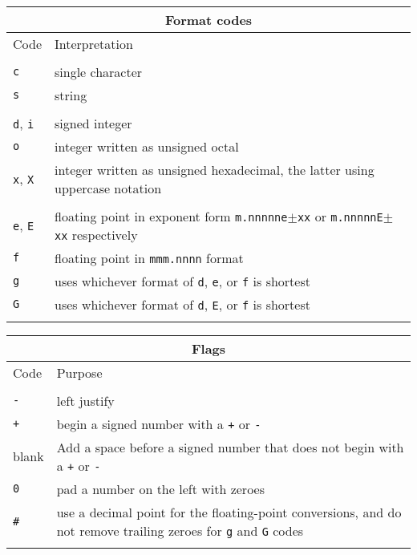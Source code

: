 \documentclass[twoside,11pt,nolof]{starlink}
\begin{document}
\ \hfill \
\begin{minipage}{75mm}
\vspace*{3mm}
\begin{tabular}{lp{61mm}}
\hline
\multicolumn{2}{c}{Format codes} \\ \hline
Code & Interpretation \\ \hline
\vspace*{-\medskipamount} \\
\texttt{c} & single character \\
\texttt{s} & string \\
\\
\texttt{d}, \texttt{i} & signed integer \\
\texttt{o} & integer written as unsigned octal \\
\texttt{x}, \texttt{X} & integer written as unsigned hexadecimal, the
           latter using uppercase notation \\
\\
\texttt{e}, \texttt{E} & floating point in exponent form \texttt{m.nnnnne$\pm$xx}
                       or \texttt{m.nnnnnE$\pm$xx} respectively \\
\texttt{f} & floating point in \texttt{mmm.nnnn} format\\
\texttt{g} & uses whichever format of \texttt{d}, \texttt{e}, or \texttt{f}
          is shortest \\
\texttt{G} & uses whichever format of \texttt{d}, \texttt{E}, or \texttt{f}
          is shortest \\
\vspace*{-\medskipamount} \\ \hline
\end{tabular}

\vspace*{10mm}
\begin{tabular}{lp{61mm}}
\hline
\multicolumn{2}{c}{Flags} \\ \hline
Code & Purpose \\ \hline
\vspace*{-\medskipamount} \\
\texttt{-} & left justify \\
\texttt{+} & begin a signed number with a \texttt{+} or \texttt{-} \\
blank & Add a space before a signed number that does not begin with a
          \texttt{+} or \texttt{-} \\
\texttt{0} & pad a number on the left with zeroes \\
\texttt{\#} & use a decimal point for the floating-point conversions, and
do not remove trailing zeroes for \texttt{g} and \texttt{G} codes \\
\vspace*{-\medskipamount} \\ \hline
\end{tabular}

\end{minipage}
\vspace*{2mm}
\end{document}
